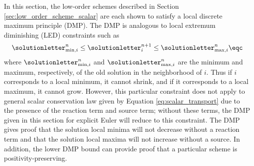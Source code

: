 In this section, the low-order schemes described in Section
\ref{sec:low_order_scheme_scalar} are each shown to satisfy a local discrete
maximum principle (DMP). The DMP is analogous to local extremum diminishing
(LED) constraints such as
\begin{equation}
   \solutionletter_{\textup{min},i}^n \leq \solutionletter_i^{n+1}
     \leq \solutionletter_{\textup{max},i}^n \eqc
\end{equation}
where $\solutionletter_{\textup{min},i}^n$ and $\solutionletter_{\textup{max},i}^n$
are the minimum and maximum, respectively, of the old solution in the
neighborhood of $i$. Thus if $i$ corresponds to a local minimum,
it cannot shrink, and if it corresponds to a local maximum, it cannot
grow. However, this particular constraint does not apply to general scalar
conservation law given by Equation \eqref{eq:scalar_transport} due
to the presence of the reaction term and source term; without these
terms, the DMP given in this section for explicit Euler will reduce
to this constraint. The DMP gives proof that the solution local minima
will not decrease without a reaction term and that the solution local
maxima will not increase without a source. In addition, the lower DMP
bound can provide proof that a particular scheme is positivity-preserving.
